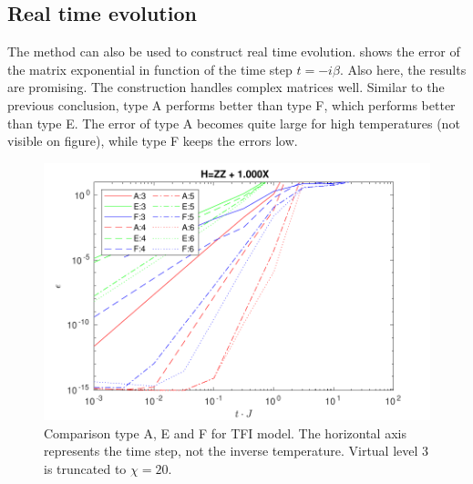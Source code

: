 




\subsection{Real time evolution} \label{subsec_rt_evo}

The method can also be used to construct real time evolution.  shows the error of the matrix exponential in function of the time step $t = -i \beta $. Also here, the results are promising. The construction handles complex matrices well. Similar to the previous conclusion, type A performs better than type F, which performs better than type E. The error of type A becomes quite large for high temperatures (not visible on figure), while type F keeps the errors low.

\begin{figure}[h!]
    \center
    \includegraphics[width=\textwidth]{Figuren/benchmarking/1D_t_ising_time.pdf}
    \caption{Comparison type A, E and F for \Gls{TFI} model. The horizontal axis represents the time step, not the inverse temperature. Virtual level 3 is truncated to $\chi=20$.  }
    \label{fig:benchmark:tising_time}
\end{figure}


